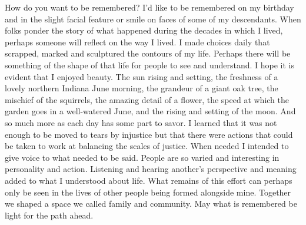 How do you want to be remembered?
I'd like to be remembered on my birthday and in the slight facial feature or smile on faces of some of my descendants. When folks ponder the story of what happened during the decades in which I lived, perhaps someone will reflect on the way I lived. I made choices daily that scrapped, marked and sculptured the contours of my life. Perhaps there will be something of the shape of that life for people to see and understand.
I hope it is evident that I enjoyed beauty. The sun rising and setting, the freshness of a lovely northern Indiana June morning, the grandeur of a giant oak tree, the mischief of the squirrels, the amazing detail of a flower, the speed at which the garden goes in a well-watered June, and the rising and setting of the moon. And so much more as each day has some part to savor. 
I learned that it was not enough to be moved to tears by injustice but that there were actions that could be taken to work at balancing the scales of justice. When needed I intended to give voice to what needed to be said. People are so varied and interesting in personality and action. Listening and hearing another's perspective and meaning added to what I understood about life. What remains of this effort can perhaps only be seen in the lives of other people being formed alongside mine. Together we shaped a space we called family and community. May what is remembered be light for the path ahead. 





